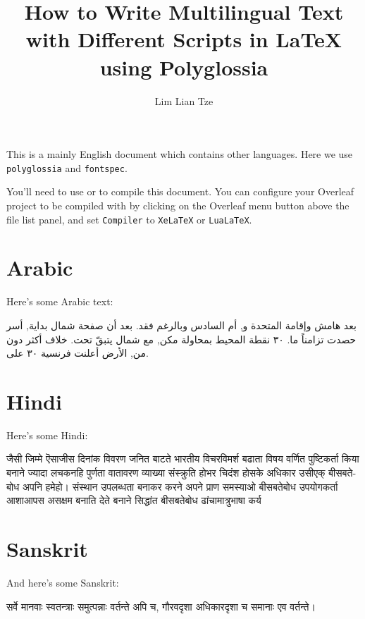 \documentclass[12pt]{scrartcl}
\title{How to Write Multilingual Text with Different Scripts in \LaTeX{} using Polyglossia}
\author{Lim Lian Tze}
\date{}
\begin{document}
\maketitle

This is a mainly English document which contains other languages. Here we use \texttt{polyglossia} and \texttt{fontspec}. 

You'll need to use  or  to compile this document. You can configure your Overleaf project to be compiled with  by clicking on the Overleaf menu button above the file list panel, and set \texttt{Compiler} to \texttt{XeLaTeX} or \texttt{LuaLaTeX}.



\section{Arabic}
Here's some Arabic text:

\begin{Arabic}
بعد هامش وإقامة المتحدة و, أم السادس وبالرغم فقد. بعد أن صفحة شمال بداية, أسر حصدت تزامناً ما. ٣٠ نقطة المحيط بمحاولة مكن, مع شمال يتبقّ تحت. خلاف أكثر دون من, الأرض أعلنت فرنسية ٣٠ على.
\end{Arabic}



\section{Hindi}

Here's some Hindi:

\begin{hindi}
जैसी जिम्मे ऎसाजीस दिनांक विवरण जनित बाटते भारतीय विचरविमर्श बढाता विषय वर्णित पुष्टिकर्ता किया बनाने ज्यादा लचकनहि पुर्णता वातावरण व्याख्या संस्क्रुति होभर चिदंश होसके अधिकार उसीएक् बीसबतेबोध अपनि हमेहो। संस्थान उपलब्धता बनाकर करने अपने प्राण समस्याओ बीसबतेबोध उपयोगकर्ता आशाआपस असक्षम बनाति देते बनाने सिद्धांत बीसबतेबोध ढांचामात्रुभाषा कर्य
\end{hindi}

\section{Sanskrit}
And here's some Sanskrit:

\begin{sanskrit}
सर्वे मानवाः स्वतन्त्राः समुत्पन्नाः वर्तन्ते अपि च, गौरवदृशा अधिकारदृशा च समानाः एव वर्तन्ते।
\end{sanskrit}
\end{document}
